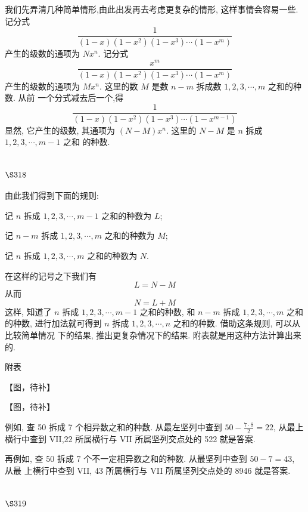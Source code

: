 我们先弄清几种简单情形,由此出发再去考虑更复杂的情形, 这样事情会容易一些. 记分式
\[
\frac{1}{(1-x)\left(1-x^{2}\right)\left(1-x^{3}\right) \cdots\left(1-x^{m}\right)}
\]
产生的级数的通项为 $N x^{n}$. 记分式
\[
\frac{x^{m}}{(1-x)\left(1-x^{2}\right)\left(1-x^{3}\right) \cdots\left(1-x^{m}\right)}
\]
产生的级数的通项为 $M x^{n}$. 这里的数 $M$ 是数 $n-m$ 拆成数 $1,2,3, \cdots, m$ 之和的种数. 从前 一个分式减去后一个,得
\[
\frac{1}{(1-x)\left(1-x^{2}\right)\left(1-x^{3}\right) \cdots\left(1-x^{m-1}\right)}
\]
显然, 它产生的级数, 其通项为 $(N-M) x^{n}$. 这里的 $N-M$ 是 $n$ 拆成 $1,2,3, \cdots, m-1$ 之和 的种数.

\section{$\S 318$}

由此我们得到下面的规则:

记 $n$ 拆成 $1,2,3, \cdots, m-1$ 之和的种数为 $L$;

记 $n-m$ 拆成 $1,2,3, \cdots, m$ 之和的种数为 $M$;

记 $n$ 拆成 $1,2,3, \cdots, m$ 之和的种数为 $N$.

在这样的记号之下我们有 
\[
L=N-M
\]
从而
\[
N=L+M
\]
这样, 知道了 $n$ 拆成 $1,2,3, \cdots, m-1$ 之和的种数, 和 $n-m$ 拆成 $1,2,3, \cdots, m$ 之和的种数, 进行加法就可得到 $n$ 拆成 $1,2,3, \cdots, n$ 之和的种数. 借助这条规则, 可以从比较简单情况 下的结果, 推出更复杂情况下的结果. 附表就是用这种方法计算出来的.

附表

【图，待补】

【图，待补】

例如, 查 50 拆成 7 个相异数之和的种数. 从最左坚列中查到 $50-\frac{7 \cdot 8}{2}=22$, 从最上 横行中查到 VII,22 所属横行与 VII 所属坚列交点处的 522 就是答案.

再例如, 查 50 拆成 7 个不一定相异数之和的种数. 从最坚列中查到 $50-7=43$, 从最 上横行中查到 VII, 43 所属横行与 VII 所属坚列交点处的 8946 就是答案. 

\section{$\S 319$}


